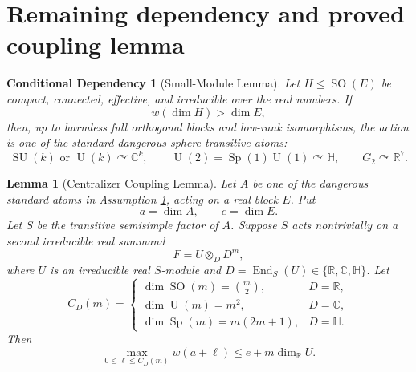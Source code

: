 \documentclass[11pt]{article}
\newtheorem{lemma}{Lemma}
\newtheorem{assumption}{Conditional Dependency}
\DeclareMathOperator{\SO}{SO}
\DeclareMathOperator{\SU}{SU}
\DeclareMathOperator{\U}{U}
\DeclareMathOperator{\Sp}{Sp}
\begin{document}
\section*{Remaining dependency and proved coupling lemma}

\begin{assumption}[Small-Module Lemma]\label{ass:small}
Let $H\leq \SO(E)$ be compact, connected, effective, and irreducible over
the real numbers.  If
\[
w(\dim H)>\dim E,
\]
then, up to harmless full orthogonal blocks and low-rank isomorphisms, the
action is one of the standard dangerous sphere-transitive atoms:
\[
\SU(k)\text{ or }\U(k)\curvearrowright \mathbb C^k,\qquad
\U(2)=\Sp(1)\U(1)\curvearrowright \mathbb H,\qquad
G_2\curvearrowright \mathbb R^7.
\]
\end{assumption}

\begin{lemma}[Centralizer Coupling Lemma]\label{lem:centralizer}
Let $A$ be one of the dangerous standard atoms in Assumption
\ref{ass:small}, acting on a real block $E$.  Put
\[
a=\dim A,\qquad e=\dim E.
\]
Let $S$ be the transitive semisimple factor of $A$.  Suppose $S$ acts
nontrivially on a second irreducible real summand
\[
F=U\otimes_D D^m,
\]
where $U$ is an irreducible real $S$-module and
$D=\operatorname{End}_S(U)\in\{\mathbb R,\mathbb C,\mathbb H\}$.  Let
\[
C_D(m)=
\begin{cases}
\dim \SO(m)=\binom{m}{2},&D=\mathbb R,\\
\dim \U(m)=m^2,&D=\mathbb C,\\
\dim \Sp(m)=m(2m+1),&D=\mathbb H.
\end{cases}
\]
Then
\[
\max_{0\leq \ell\leq C_D(m)} w(a+\ell)
   \leq e + m\dim_{\mathbb R} U.
\]
\end{lemma}
\end{document}
